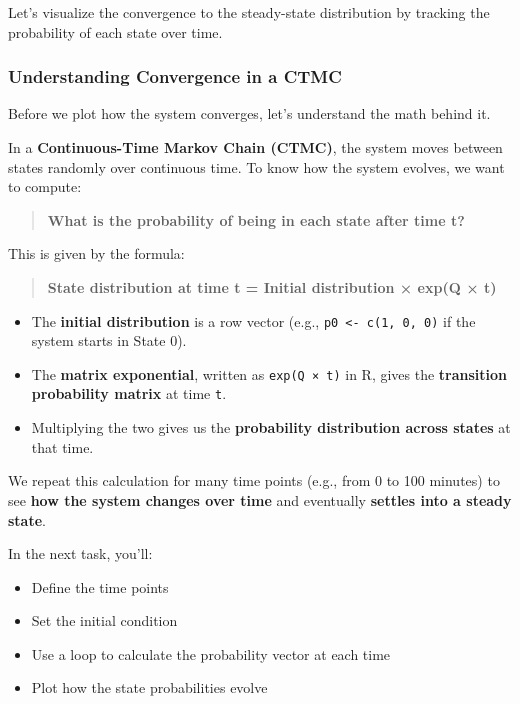 \documentclass[
]{article}
\providecommand{\tightlist}{%
  \setlength{\itemsep}{0pt}\setlength{\parskip}{0pt}}\usepackage{longtable,booktabs,array}
\begin{document}
Let's visualize the convergence to the steady-state distribution by
tracking the probability of each state over time.

\subsubsection{Understanding Convergence in a
CTMC}\label{understanding-convergence-in-a-ctmc}

Before we plot how the system converges, let's understand the math
behind it.

In a \textbf{Continuous-Time Markov Chain (CTMC)}, the system moves
between states randomly over continuous time. To know how the system
evolves, we want to compute:

\begin{quote}
\textbf{What is the probability of being in each state after time t?}
\end{quote}

This is given by the formula:

\begin{quote}
\textbf{State distribution at time t = Initial distribution × exp(Q ×
t)}
\end{quote}

\begin{itemize}
\tightlist
\item
  The \textbf{initial distribution} is a row vector (e.g.,
  \texttt{p0\ \textless{}-\ c(1,\ 0,\ 0)} if the system starts in State
  0).
\item
  The \textbf{matrix exponential}, written as \texttt{exp(Q\ ×\ t)} in
  R, gives the \textbf{transition probability matrix} at time
  \texttt{t}.
\item
  Multiplying the two gives us the \textbf{probability distribution
  across states} at that time.
\end{itemize}

We repeat this calculation for many time points (e.g., from 0 to 100
minutes) to see \textbf{how the system changes over time} and eventually
\textbf{settles into a steady state}.

In the next task, you'll:

\begin{itemize}
\tightlist
\item
  Define the time points
\item
  Set the initial condition
\item
  Use a loop to calculate the probability vector at each time
\item
  Plot how the state probabilities evolve
\end{itemize}
\end{document}
